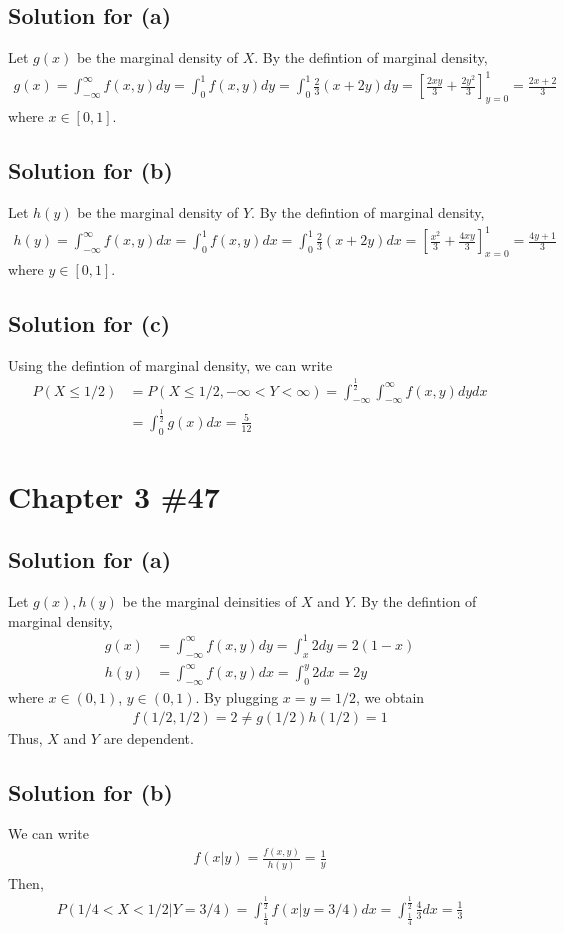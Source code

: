 \documentclass{scrartcl}
\begin{document}
\subsection{Solution for (a)}
Let \(g(x)\) be the marginal density of \(X\). By the defintion of marginal
density,
\begin{align*}
  g(x)
  = \int^\infty_{-\infty} f(x, y) dy
  = \int^1_0 f(x, y) dy
  = \int^1_0 \frac{2}{3} (x + 2y) dy
  = \left[ \frac{2xy}{3} + \frac{2y^2}{3} \right]^1_{y = 0}
  = \frac{2x + 2}{3}
\end{align*}
where \(x \in [0, 1]\).

\subsection{Solution for (b)}
Let \(h(y)\) be the marginal density of \(Y\). By the defintion of marginal
density,
\begin{align*}
  h(y)
  = \int^\infty_{-\infty} f(x, y) dx
  = \int^1_0 f(x, y) dx
  = \int^1_0 \frac{2}{3} (x + 2y) dx
  = \left[ \frac{x^2}{3} + \frac{4xy}{3} \right]^1_{x = 0}
  = \frac{4y + 1}{3}
\end{align*}
where \(y \in [0, 1]\).

\subsection{Solution for (c)}
Using the defintion of marginal density, we can write
\begin{align*}
  P(X \leq 1 / 2)
  &= P(X \leq 1 / 2, -\infty < Y < \infty)
  = \int^{\frac{1}{2}}_{-\infty} \int^\infty_{-\infty} f(x, y) dy dx \\
  &= \int^{\frac{1}{2}}_0 g(x) dx = \frac{5}{12}
\end{align*}

\section{Chapter 3 \#47}
\subsection{Solution for (a)}
Let \(g(x), h(y)\) be the marginal deinsities of \(X\) and \(Y\). By the
defintion of marginal density,
\begin{align*}
  g(x)
  &= \int^\infty_{-\infty} f(x, y) dy
  = \int^1_x 2 dy
  = 2(1 - x) \\
  h(y)
  &= \int^\infty_{-\infty} f(x, y) dx
  = \int^y_0 2 dx
  = 2y
\end{align*}
where \(x \in (0, 1)\), \(y \in (0, 1)\).
By plugging \(x = y = 1/2\), we obtain
\begin{align*}
  f(1/2, 1/2) = 2 \not = g(1/2) h(1/2) = 1
\end{align*}
Thus, \(X\) and \(Y\) are dependent.

\subsection{Solution for (b)}
We can write
\begin{align*}
  f(x | y) = \frac{f(x, y)}{h(y)} = \frac{1}{y}
\end{align*}
Then,
\begin{align*}
  P(1/4 < X < 1/2 | Y = 3/4)
  = \int^\frac{1}{2}_\frac{1}{4} f(x | y = 3/4) dx
  = \int^\frac{1}{2}_\frac{1}{4} \frac{4}{3} dx
  = \frac{1}{3}
\end{align*}
\end{document}
